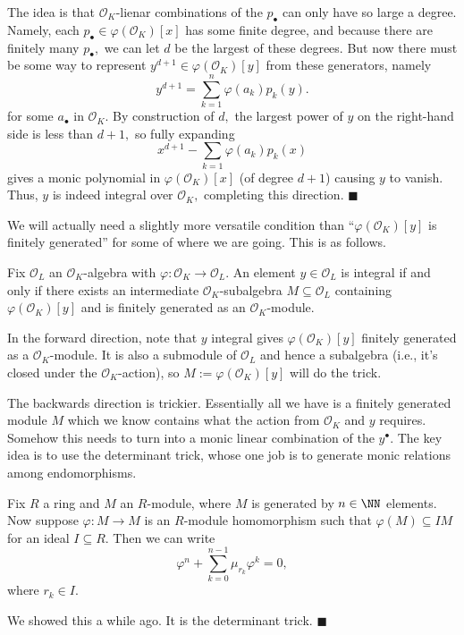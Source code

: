 The idea is that $\mathcal O_K$-lienar combinations of the $p_\bullet$ can only have so large a degree. Namely, each $p_\bullet\in\varphi(\mathcal O_K)[x]$ has some finite degree, and because there are finitely many $p_\bullet,$ we can let $d$ be the largest of these degrees. But now there must be some way to represent $y^{d+1}\in\varphi(\mathcal O_K)[y]$ from these generators, namely
\[y^{d+1}=\sum_{k=1}^n\varphi(a_k)p_k(y).\]
for some $a_\bullet$ in $\mathcal O_K.$ By construction of $d,$ the largest power of $y$ on the right-hand side is less than $d+1,$ so fully expanding
\[x^{d+1}-\sum_{k=1}\varphi(a_k)p_k(x)\]
gives a monic polynomial in $\varphi(\mathcal O_K)[x]$ (of degree $d+1$) causing $y$ to vanish. Thus, $y$ is indeed integral over $\mathcal O_K,$ completing this direction. $\blacksquare$

We will actually need a slightly more versatile condition than ``$\varphi(\mathcal O_K)[y]$ is finitely generated'' for some of where we are going. This is as follows.
\begin{lemma}
    Fix $\mathcal O_L$ an $\mathcal O_K$-algebra with $\varphi:\mathcal O_K\to\mathcal O_L.$ An element $y\in\mathcal O_L$ is integral if and only if there exists an intermediate $\mathcal O_K$-subalgebra $M\subseteq\mathcal O_L$ containing $\varphi(\mathcal O_K)[y]$ and is finitely generated as an $\mathcal O_K$-module.
\end{lemma}
In the forward direction, note that $y$ integral gives $\varphi(\mathcal O_K)[y]$ finitely generated as a $\mathcal O_K$-module. It is also a submodule of $\mathcal O_L$ and hence a subalgebra (i.e., it's closed under the $\mathcal O_K$-action), so $M:=\varphi(\mathcal O_K)[y]$ will do the trick.

The backwards direction is trickier. Essentially all we have is a finitely generated module $M$ which we know contains what the action from $\mathcal O_K$ and $y$ requires. Somehow this needs to turn into a monic linear combination of the $y^\bullet.$ The key idea is to use the determinant trick, whose one job is to generate monic relations among endomorphisms.
\begin{proposition}
    Fix $R$ a ring and $M$ an $R$-module, where $M$ is generated by $n\in\NN$ elements. Now suppose $\varphi:M\to M$ is an $R$-module homomorphism such that $\varphi(M)\subseteq IM$ for an ideal $I\subseteq R.$ Then we can write
    \[\varphi^n+\sum_{k=0}^{n-1}\mu_{r_k}\varphi^k=0,\]
    where $r_k\in I.$
\end{proposition}
We showed this a while ago. It is the determinant trick. $\blacksquare$

